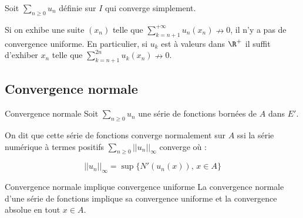 \begin{proposition}{}{}
    Soit $\sum_{n \geqslant 0} u_n$ définie sur $I$ qui converge simplement. 

    Si on exhibe une suite $(x_n)$ telle que $\displaystyle \sum_{k = n + 1 }^{+ \infty  } u_n(x_n) \nrightarrow 0$,
    il n'y a pas de convergence uniforme. En particulier, si $u_k$ est à valeurs dans $\R^+$ il suffit 
    d'exhiber $x_n$ telle que $\displaystyle \sum_{k = n + 1}^{2n} u_k(x_n) \nrightarrow 0$.
\end{proposition}

\subsection{Convergence normale}

\begin{definition}{Convergence normale}{}
    Soit $\displaystyle \sum_{n \geqslant 0} u_n$ une série de fonctions bornées de $A$ dans $E'$.

    On dit que cette série de fonctions converge normalement sur $A$ ssi la série numérique 
    à termes positifs $\displaystyle \sum_{n \geqslant 0} || u_n ||_{\infty}$ converge où :

    \[||u_n||_{\infty} = \sup\{ N'(u_n(x)), \, x \in A \}\]
\end{definition}

\begin{theoreme}{Convergence normale implique convergence uniforme}{}
    La convergence normale d'une série de fonctions implique sa convergence uniforme et la convergence 
    absolue en tout $x \in A$. 
\end{theoreme}


